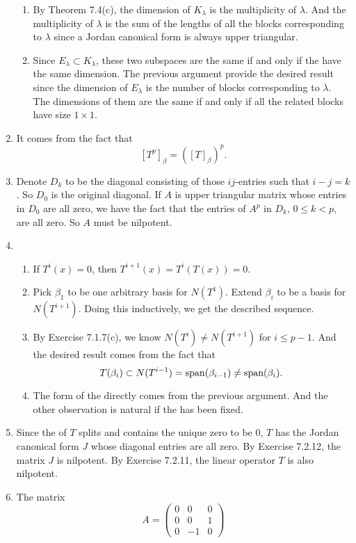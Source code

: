 \begin{enumerate}
\begin{enumerate}
\item By Theorem 7.4(c), the dimension of $K_{\lambda}$ is the multiplicity of $\lambda$. And the multiplicity of $\lambda$ is the sum of the lengths of all the blocks corresponding to $\lambda$ since a Jordan canonical form is always upper triangular.
\item Since $E_{\lambda}\subset K_{\lambda}$, these two subspaces are the same if and only if the have the same dimension. The previous argument provide the desired result since the dimension of $E_{\lambda}$ is the number of blocks corresponding to $\lambda$. The dimensions of them are the same if and only if all the related blocks have size $1\times 1$.
\end{enumerate}
\item It comes from the fact that 
\[[T^p]_{\beta}=([T]_{\beta})^p.\]
\item Denote $D_k$ to be the diagonal consisting of those $ij$-entries such that $i-j=k$. So $D_0$ is the original diagonal. If $A$ is upper triangular matrix whose entries in $D_0$ are all zero, we have the fact that the entries of $A^p$ in $D_k$, $0\leq k< p$, are all zero. So $A$ must be nilpotent.
\item \begin{enumerate}
\item If $T^i(x)=0$, then $T^{i+1}(x)=T^i(T(x))=0$.
\item Pick $\beta_{1}$ to be one arbitrary basis for $N(T^{1})$. Extend $\beta_{i}$ to be a basis for $N(T^{i+1})$. Doing this inductively, we get the described sequence.
\item By Exercise 7.1.7(c), we know $N(T^i)\neq N(T^{i+1})$ for $i\leq p-1$. And the desired result comes from the fact that 
\[T(\beta_{i})\subset N(T^{i-1})=\sp(\beta_{i-1})\neq \sp(\beta_{i}).\]
\item The form of the \charpoly{} directly comes from the previous argument. And the other observation is natural if the \charpoly{} has been fixed.
\end{enumerate}
\item Since the \charpoly{} of $T$ splits and contains the unique zero to be $0$, $T$ has the Jordan canonical form $J$ whose diagonal entries are all zero. By Exercise 7.2.12, the matrix $J$ is nilpotent. By Exercise 7.2.11, the linear operator $T$ is also nilpotent.
\item The matrix 
\[A=\begin{pmatrix}0&0&0\\0&0&1\\0&-1&0\end{pmatrix}\]

\end{enumerate}

